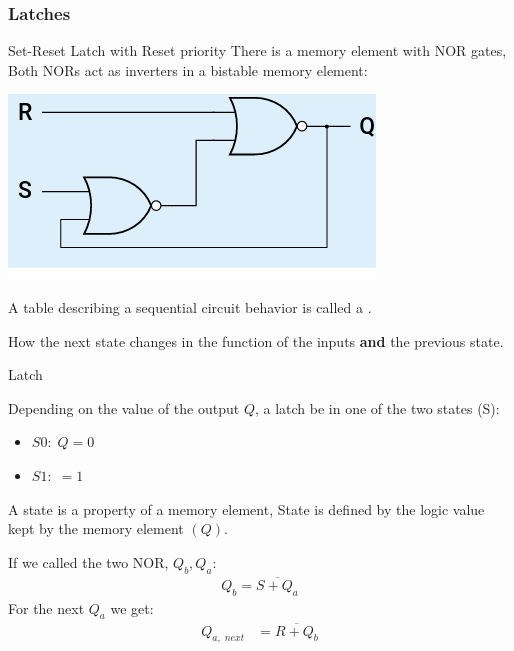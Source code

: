     \subsubsection{Latches}
    \begin{parag}{Set-Reset Latch with Reset priority}
        There is a memory element with NOR gates, \\
        Both NORs act as inverters in a bistable memory element:
        \begin{center}
            \includegraphics[scale=0.5]{42025-03-31.png}
        \end{center}
        \begin{definition}
            A table describing a sequential circuit behavior is called a .
        \end{definition}
        How the next state changes in the function of the inputs \textbf{and} the previous state.
       \begin{subparag}{Latch}
           \begin{definition}
               Depending on the value of the output $Q$,  a latch be in one of the two states (S):
               \begin{itemize}
                   \item $S0: \; Q = 0$
                   \item $S1:\; = 1$
               \end{itemize}
               A state is a property of a memory element, State is defined by the logic value kept by the memory element $(Q)$.
           \end{definition}
       \end{subparag} 
       If we called the two NOR, $Q_b, Q_a$:
       \begin{align*}
           Q_b = \overline{S + Q_a}
       \end{align*}
       For the next $Q_a$ we get:
       \begin{align*}
           Q_{a, \; next} &= \overline{R + Q_b}\\

\end{align*}
\end{parag}
